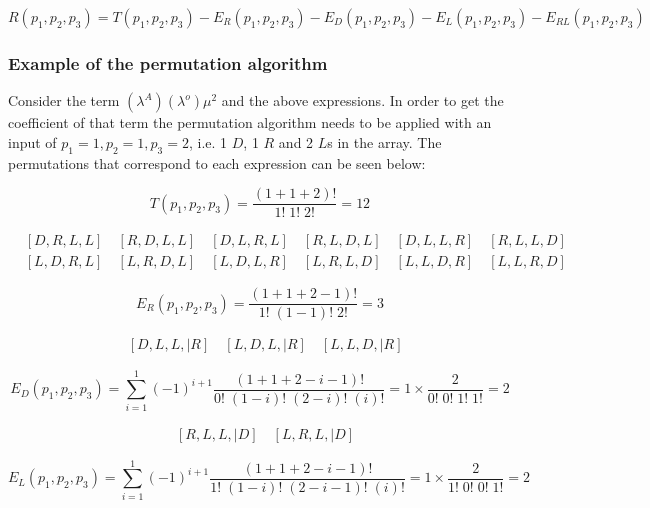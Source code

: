 \begin{equation*}
    R(p_1, p_2, p_3) = T(p_1, p_2, p_3) - E_R(p_1, p_2, p_3) - E_D(p_1, p_2, p_3) - E_L(p_1, p_2, p_3) - E_{RL}(p_1, p_2, p_3)
\end{equation*}

\subsubsection{Example of the permutation algorithm}
Consider the term \((\lambda^A) (\lambda^o) \mu^2\) and the above expressions.
In order to get the coefficient of that term the permutation algorithm needs to be applied with an input of \(p_1=1, p_2=1, p_3=2\), i.e. 1 \(D\), 1 \(R\) and 2 \(L\)s in the array.
The permutations that correspond to each expression can be seen below:

\begin{equation*}
    T(p_1, p_2, p_3) = \frac{(1+1+2)!}{1! \; 1! \; 2!} = 12
\end{equation*}

\begin{align*}
    & [D, R, L, L] \quad [R, D, L, L] \quad [D, L, R, L] \quad [R, L, D, L] \quad [D, L, L, R] \quad [R, L, L, D] \\
    & [L, D, R, L] \quad [L, R, D, L] \quad [L, D, L, R] \quad [L, R, L, D] \quad [L, L, D, R] \quad [L, L, R, D]
\end{align*}

\begin{equation*}
    E_R(p_1, p_2, p_3) = \frac{(1+1+2-1)!}{1! \; (1-1)! \; 2!} = 3
\end{equation*}

\begin{align*}
    & [D, L, L, | R] \quad [L, D, L, | R] \quad [L, L, D, | R]
\end{align*}


\begin{equation*}
    E_D(p_1, p_2, p_3) = \sum_{i=1}^{1} (-1)^{i+1} \frac{(1+1+2-i-1)!}{0! \; (1-i)! \; (2-i)! \; (i)!} = 1 \times \frac{2}{0! \; 0! \; 1! \; 1!} = 2
\end{equation*}

\begin{align*}
    & [R, L, L, | D] \quad [L, R, L, | D] 
\end{align*}


\begin{equation*}
    E_L(p_1, p_2, p_3) = \sum_{i=1}^{1} (-1)^{i+1} \frac{(1+1+2-i-1)!}{1! \; (1-i)! \; (2-i-1)! \; (i)!} = 1 \times \frac{2}{1! \; 0! \; 0! \; 1!} = 2
\end{equation*}

